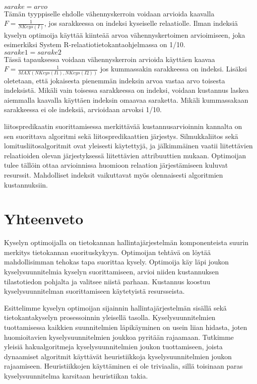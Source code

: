 \documentclass[finnish]{tktltiki2}
\theoremstyle{definition}
\theoremstyle{remark}
\begin{document}
\\\newline
$sarake = arvo$ 
\\
Tämän tyyppiselle ehdolle vähennyskerroin voidaan arvioida kaavalla $F = \frac{1}{NKeys(I)}$, jos sarakkeessa on indeksi kyseiselle relaatiolle. Ilman indeksiä kyselyn optimoija käyttää kiinteää arvoa vähennyskertoimen arvioimiseen, joka esimerkiksi System R-relaatiotietokantaohjelmassa on 1/10.
\\\newline
$sarake1 = sarake2$ 
\\
Tässä tapauksessa voidaan vähennyskerroin arvioida käyttäen kaavaa $F = \frac{1}{MAX (NKeys(I1), NKeys(I2))}$ jos kummassakin sarakkeessa on indeksi. Lisäksi oletetaan, että jokaisesta pienemmän indeksin arvoa vastaa arvo toisesta indeksistä. Mikäli vain toisessa sarakkeessa on indeksi, 
voidaan kustannus laskea aiemmalla kaavalla käyttäen indeksin omaavaa saraketta. Mikäli kummassakaan sarakkeessa ei ole indeksiä, arvioidaan arvoksi 1/10.

liitospredikaatin suorittamisessa merkittävää kustannusarvioinnin kannalta on sen suorittava algoritmi sekä liitospredikaattien järjestys. Silmukkaliitos sekä lomitusliitosalgoritmit ovat yleisesti käytettyjä, ja jälkimmäinen vaatii liitettävien relaatioiden olevan järjestyksessä liitettävien attribuuttien mukaan. Optimoijan tulee tällöin ottaa arvioinnissa huomioon relaation järjestämiseen kuluvat resurssit. Mahdolliset indeksit vaikuttavat myös olennaisesti algoritmien kustannuksiin. 
\section{Yhteenveto}

Kyselyn optimoijalla on tietokannan hallintajärjestelmän komponenteista suurin merkitys tietokannan suorituskykyyn. Optimoijan tehtävä on löytää mahdollisimman tehokas tapa suorittaa kysely. Optimoija käy läpi joukon kyselysuunnitelmia kyselyn suorittamiseen, arvioi niiden kustannuksen tilastotiedon pohjalta ja valitsee niistä parhaan. Kustannus koostuu kyselysuunnitelman suorittamiseen käytetyistä resursseista. 

Esittelimme kyselyn optimoijan sijainnin hallintajärjestelmän sisällä sekä tietokantakyselyn prosessoinnin yleisellä tasolla. Kyselysuunnitelmien tuottamisessa kaikkien suunnitelmien läpikäyminen on usein liian hidasta, joten huomioitavien kyselysuunnitelmien joukkoa pyritään rajaamaan. Tutkimme yleisiä hakualgoritmeja kyselysuunnitelmien joukon tuottamiseen, joista dynaamiset algoritmit käyttävät heuristiikkoja kyselysuunnitelmien joukon rajaamiseen. Heuristiikkojen käyttäminen ei ole triviaalia, sillä toisinaan paras kyselysuunnitelma karsitaan heuristiikan takia. 
\end{document}
